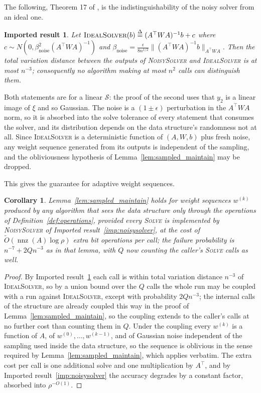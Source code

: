 \documentclass[11pt]{article}
\newtheorem{importedresult}{Imported result}[section]
\newtheorem{corollary}[lemma]{Corollary}
\newcommand{\nnz}{\operatorname{nnz}}
\renewcommand{\O}{\widetilde O}
\newcommand{\defeq}{\stackrel{\Delta}{=}}
\begin{document}
The following, Theorem 17 of \cite{LS15}, is the
indistinguishability of the noisy solver from an ideal one.

\begin{importedresult}
\label{imp:noisysolver_tv}
Let $\textsc{IdealSolver}(b) \defeq (A^\top W A)^{-1} b + c$ where
$c \sim N(0, \beta_{\mathrm{noise}}^2 (A^\top W A)^{-1})$ and
$\beta_{\mathrm{noise}} = \frac{\epsilon}{8 n^{1/2}} \|(A^\top W A)^{-1} b\|_{A^\top W A}$.
Then the total variation distance between the outputs of \textsc{NoisySolver}
and \textsc{IdealSolver} is at most $n^{-3}$; consequently no algorithm making
at most $n^{2}$ calls can distinguish them.
\end{importedresult}

Both statements are for a linear $\mathcal{S}$: the proof of the second uses
that $y_2$ is a linear image of
$\xi$ and so Gaussian.
The noise is a $(1 \pm \epsilon)$ perturbation in the
$A^\top W A$ norm, so it is absorbed into the solve tolerance of every statement
that consumes the solver, and its distribution depends on the data structure's
randomness not at all.
Since \textsc{IdealSolver} is a deterministic function of $(A, W, b)$ plus fresh
noise, any weight sequence generated from its outputs is independent of the
sampling, and the obliviousness hypothesis of Lemma~\ref{lem:sampled_maintain}
may be dropped.

This gives the guarantee for adaptive weight sequences.

\begin{corollary}
\label{cor:adaptive}
Lemma~\ref{lem:sampled_maintain} holds for weight sequences $w^{(k)}$ produced
by any algorithm that sees the data structure only through the operations of
Definition~\ref{def:operations}, provided every \textsc{Solve} is implemented by
\textsc{NoisySolver} of Imported result~\ref{imp:noisysolver}, at the cost of
$\O(\nnz(A) \log \rho)$ extra bit operations per call; the failure probability
is $n^{-7} + 2 Q n^{-3}$ as in that lemma, with
$Q$ now counting the caller's \textsc{Solve} calls as well.
\end{corollary}

\begin{proof}
By Imported result~\ref{imp:noisysolver_tv} each call is within total variation
distance $n^{-3}$ of \textsc{IdealSolver}, so by a union bound over the
$Q$ calls the whole run may be coupled with a run against \textsc{IdealSolver},
except with probability $2 Q n^{-3}$; the internal calls of the structure are
already coupled this way in the proof of Lemma~\ref{lem:sampled_maintain}, so
the coupling extends to the caller's calls at no further cost than counting them
in $Q$.
Under the coupling every $w^{(k)}$ is a function of
$A$, of
$w^{(0)}, \ldots, w^{(k - 1)}$, and of Gaussian noise independent of the
sampling used inside the data structure, so the sequence is oblivious in the
sense required by Lemma~\ref{lem:sampled_maintain}, which applies verbatim.
The extra cost per call is one additional solve and one multiplication by
$A^\top$, and by Imported result~\ref{imp:noisysolver} the accuracy degrades by
a constant factor, absorbed into $\rho^{-O(1)}$.
\end{proof}
\end{document}
